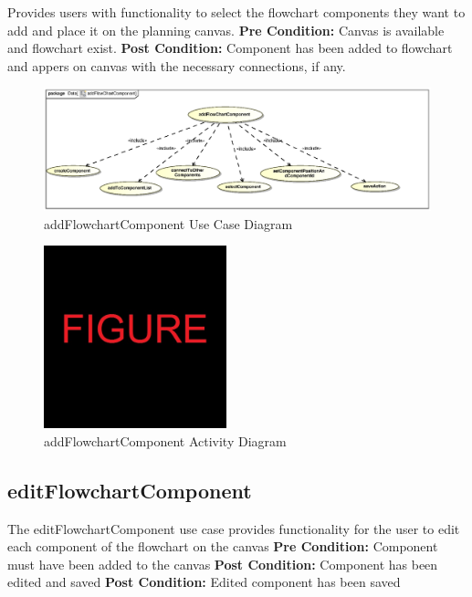 \documentclass[11pt,a4paper,titlepage]{article}
\begin{document}
Provides users with functionality to select the flowchart components they want to add and place it on the planning canvas.\newline\newline
\textbf{Pre Condition:} Canvas is available and flowchart exist.\newline\newline
\textbf{Post Condition:} Component has been added to flowchart and appers on canvas with the necessary connections, if any.

\begin{figure}[H]
  \centering
\includegraphics[width=500px]{addFlowChartComponent.eps}
\caption{addFlowchartComponent Use Case Diagram}
\end{figure}

\begin{figure}[H]
  \centering
\includegraphics[width=200px]{figure.jpg}
\caption{addFlowchartComponent Activity Diagram}
\end{figure}

\newpage
\subsection{editFlowchartComponent}

The editFlowchartComponent use case provides functionality for the user to edit each component of the flowchart on the canvas \newline\newline
\textbf{Pre Condition:} Component must have been added to the canvas\newline\newline
\textbf{Post Condition:} Component has been edited and saved\newline
\textbf{Post Condition:} Edited component has been saved
\end{document}
